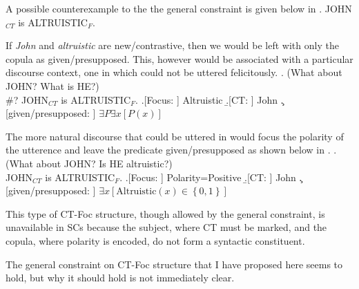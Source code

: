 \documentclass[GPFinal]{subfiles}
\begin{document}
A possible counterexample to the the general constraint is given below in \Next
\ex. JOHN$_{CT}$ is ALTRUISTIC$_F$.

If \textit{John} and \textit{altruistic} are new/contrastive, then we would be left with only the copula as given/presupposed.
This, however would be associated with a particular discourse context, one in which \Last could not be uttered felicitously.
\ex. (What about JOHN? What is HE?)\\
\#? JOHN$_{CT}$ is ALTRUISTIC$_F$.
\a.[Focus: ] Altruistic
\b.[CT: ] John
\c.[given/presupposed: ] $\exists P\exists x[P(x)]$

The more natural discourse that \LLast could be uttered in would focus the polarity of the utterence and leave the predicate given/presupposed as shown below in \Next.
\ex. (What about JOHN? Is HE altruistic?)\\
JOHN$_{CT}$ is ALTRUISTIC$_F$.
\a.[Focus: ] Polarity=Positive 
\b.[CT: ] John
\c.[given/presupposed: ] $\exists x[\text{Altruistic}(x) \in \left\{ 0,1 \right\}]$

This type of CT-Foc structure, though allowed by the general constraint, is unavailable in SCs because the subject, where CT must be marked, and the copula, where polarity is encoded, do not form a syntactic constituent.

The general constraint on CT-Foc structure that I have proposed here seems to hold, but why it should hold is not immediately clear.
\end{document}
